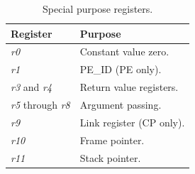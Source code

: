 

\begin{table}[b]
\caption{Special purpose registers.}
\begin{center}
\begin{tabular}{@{}l l@{}}
\toprule
\textbf{Register} & \textbf{Purpose} \\ \hline
\emph{r0} & Constant value zero. \\
\emph{r1} & PE\_ID (PE only). \\
\emph{r3} and \emph{r4} & Return value registers. \\
\emph{r5} through \emph{r8} & Argument passing. \\
\emph{r9} & Link register (CP only). \\ 
\emph{r10} & Frame pointer. \\
\emph{r11} & Stack pointer. \\
\bottomrule
\end{tabular}
\end{center}
\label{table:special_registers}
\end{table}%

